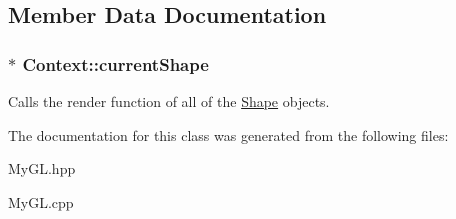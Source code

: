 \subsection{Member Data Documentation}
\hypertarget{classContext_a8c5402128ba3105635ac7d14353d934a}{}
\subsubsection[{current\+Shape}]{$\ast$ Context\+::current\+Shape}\label{classContext_a8c5402128ba3105635ac7d14353d934a}
Calls the render function of all of the \hyperlink{classShape}{Shape} objects. 

The documentation for this class was generated from the following files\+:\begin{DoxyCompactItemize}
\item 
My\+G\+L.\+hpp\item 
My\+G\+L.\+cpp\end{DoxyCompactItemize}

